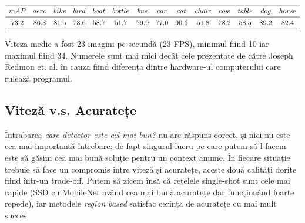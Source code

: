 \begin{table}[h]
\centering
$\begin{array}{ *{20}{c} }
\toprule
mAP & aero & bike  & bird   & boat & bottle & bus & car  & cat    & chair & cow  & table & dog  & horse\\
\midrule
73.2 & 86.3 & 81.5 & 73.6 & 58.7 & 51.7 & 79.9 & 77.0 & 90.6 & 51.8  & 78.2 & 58.5 & 89.2 & 82.4\\
\bottomrule
\end{array}$
\end{table}

Viteza medie a fost 23 imagini pe secundă (23 FPS), minimul fiind 10 iar maximul fiind 34. Numerele sunt mai mici decât cele prezentate de către Joseph Redmon et. al. în \cite{DBLP:journals/corr/abs-1804-02767} cauza fiind diferența dintre hardware-ul computerului care rulează programul.


\subsection{Viteză v.s. Acuratețe}
Întrabarea \textit{care detector este cel mai bun?} nu are răspuns corect, și nici nu este cea mai importantă întrebare; de fapt singurul lucru pe care putem să-l facem este să găsim cea mai bună soluție pentru un context anume. În fiecare situație trebuie să face un compromis între viteză și acuratețe, aceste două calități dorite fiind într-un trade-off.\newline
Putem să zicem însă că rețelele single-shot sunt cele mai rapide (SSD cu MobileNet având cea mai bună acuratețe dar funcționând foarte repede), iar metodele \textit{region based} satisfac cerința de acuratețe cu mai mult succes.